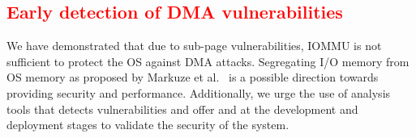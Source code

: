 \subsection{\textcolor{red}{Early detection of DMA vulnerabilities}}
We have demonstrated that due to sub-page vulnerabilities, IOMMU is not sufficient to protect the OS against DMA attacks. Segregating I/O memory from OS memory as proposed by Markuze et al.~\cite{MMT16,MSMT18} is a possible direction towards providing security and performance. Additionally, we urge the use of analysis tools that detects \subpage{} vulnerabilities and offer \tool{} and \dkasan at the development and deployment stages to validate the security of the system.






